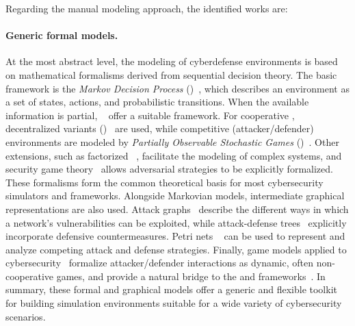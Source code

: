 Regarding the manual modeling approach, the identified works are:

\paragraph{Generic formal models.}
At the most abstract level, the modeling of cyberdefense environments is based on mathematical formalisms derived from sequential decision theory. The basic framework is the \textit{Markov Decision Process} ()~\cite{puterman1994mdp}, which describes an environment as a set of states, actions, and probabilistic transitions. When the available information is partial, ~\cite{kaelbling1998pomdp} offer a suitable framework. For cooperative , decentralized variants ()~\cite{Oliehoek2016} are used, while competitive (attacker/defender) environments are modeled by \textit{Partially Observable Stochastic Games} ()~\cite{hansen2004posg}. Other extensions, such as factorized ~\cite{guestrin2003factored}, facilitate the modeling of complex systems, and security game theory~\cite{manshaei2013game} allows adversarial strategies to be explicitly formalized.
These formalisms form the common theoretical basis for most cybersecurity simulators and frameworks. Alongside Markovian models, intermediate graphical representations are also used. Attack graphs~\cite{CPhilips1998} describe the different ways in which a network's vulnerabilities can be exploited, while attack-defense trees~\cite{BKordy2010} explicitly incorporate defensive countermeasures. Petri nets ~\cite{MPetty2022,JBland2020,SYamaguchi2020} can be used to represent and analyze competing attack and defense strategies. Finally, game models applied to cybersecurity~\cite{MPanfili2018,AAttiah2018,CXiaolin2008} formalize attacker/defender interactions as dynamic, often non-cooperative games, and provide a natural bridge to the  and  frameworks~\cite{beynier2010,terry2020pettingzoo,bernstein2013}.
In summary, these formal and graphical models offer a generic and flexible toolkit for building simulation environments suitable for a wide variety of cybersecurity scenarios.

